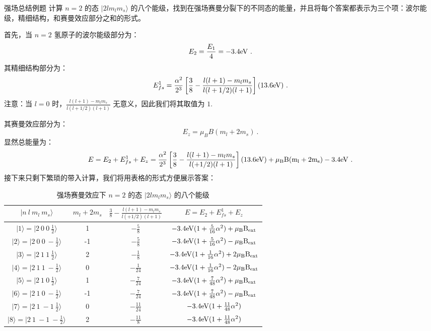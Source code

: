 \begin{example}{强场总结例题}
计算 $n=2$ 的态 $|2lm_lm_s\rangle$ 的八个能级，找到在强场赛曼分裂下的不同态的能量，并且将每个答案都表示为三个项：波尔能级，精细结构，和赛曼效应部分之和的形式。

首先，当 $n=2$ 氢原子的波尔能级部分为：
\begin{equation}
E_2=\frac{E_1}{4}=-3.4\rm{eV}~.
\end{equation}
其精细结构部分为：
\begin{equation}
E_{fs}^1=\frac{\alpha^2}{2^3}\left[\frac{3}{8}-\frac{l(l+1)-m_lm_s}{l(l+1/2)(l+1)}\right](13.6 \rm{eV})~.
\end{equation}
注意：当 $l=0$ 时，$\frac{l(l+1)-m_lm_s}{l(l+1/2)(l+1)}$ 无意义，因此我们将其取值为 $1$.

其赛曼效应部分为：
\begin{equation}
E_z =\mu_BB(m_l+2m_s)~.
\end{equation}
显然总能量为：
\begin{equation}
E=E_2+E_{fs}^1+E_z = \frac{\alpha^2}{2^3}\left[\frac{3}{8}-\frac{l(l+1)-m_lm_s}{l(+1/2)(l+1)}\right](13.6 \rm{eV})+\mu_BB(m_l+2m_s)-3.4 \rm{eV}~.
\end{equation}
接下来只剩下繁琐的带入计算，我们将用表格的形式方便展示答案：
\begin{table}[ht]
\centering
\caption{强场赛曼效应下 $n=2$ 的态 $|2lm_lm_s\rangle$ 的八个能级}\label{tab_ZemEff_1}
\begin{tabular}{|c|c|c|c|}
\hline
$|n \ l \ m_l \ m_s\rangle$& $m_l+2m_s$ & $\frac{3}{8}-\frac{l(l+1)-m_lm_s}{l(+1/2)(l+1)}$ & $E=E_2+E_{fs}^1+E_z $ \\
\hline
$|1\rangle = |2\ 0 \ 0 \ \frac{1}{2}\rangle$ & 1 & $-\frac{5}{8}$ & $-3.4 \rm{eV}(1+\frac{5}{16}\alpha^2)+\mu_BB_{ext}$ \\
\hline
$|2\rangle = |2\ 0 \ 0 \ -\frac{1}{2}\rangle$ & -1 & $-\frac{5}{8}$ & $-3.4 \rm{eV}(1+\frac{5}{16}\alpha^2)-\mu_BB_{ext}$ \\
\hline
$|3\rangle = |2\ 1 \ 1 \ \frac{1}{2}\rangle$ & 2 & $-\frac{1}{8}$ & $-3.4 \rm{eV}(1+\frac{1}{16}\alpha^2)+2\mu_BB_{ext}$ \\
\hline
$|4\rangle = |2\ 1 \ 1 \ -\frac{1}{2}\rangle$ & 0 & $-\frac{1}{24}$ & $-3.4 \rm{eV}(1+\frac{1}{16}\alpha^2)-2\mu_BB_{ext}$ \\
\hline
$|5\rangle = |2\ 1 \ 0 \ \frac{1}{2}\rangle$ & 1 & $-\frac{7}{24}$ & $-3.4 \rm{eV}(1+\frac{7}{48}\alpha^2)+\mu_BB_{ext}$ \\
\hline
$|6\rangle = |2\ 1 \ 0 \ -\frac{1}{2}\rangle$ & -1 & $-\frac{7}{24}$ & $-3.4 \rm{eV}(1+\frac{7}{48}\alpha^2)-\mu_BB_{ext}$ \\
\hline
$|7\rangle = |2\ 1 \ -1 \ \frac{1}{2}\rangle$ & 0 & $-\frac{11}{24}$ & $-3.4 \rm{eV}(1+\frac{11}{48}\alpha^2)$ \\
\hline
$|8\rangle = |2\ 1 \ -1 \ -\frac{1}{2}\rangle$ & 2 & $-\frac{11}{8}$ & $-3.4 \rm{eV}(1+\frac{11}{48}\alpha^2)$ \\
\hline
\end{tabular}
\end{table}
\end{example}
